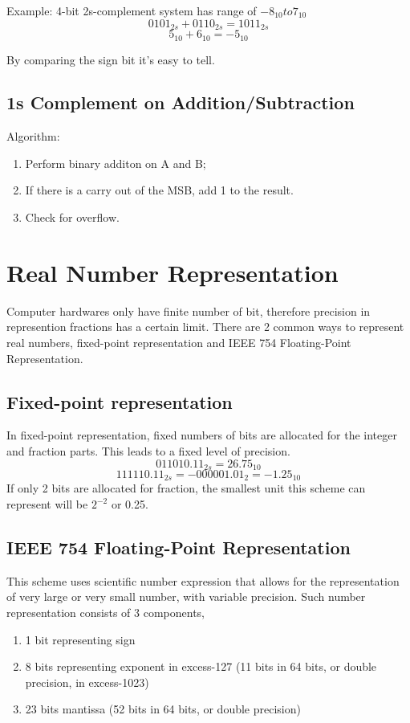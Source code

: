\documentclass[12pt]{article} %
\begin{document}
Example: 4-bit 2s-complement system has range of \(-8_{10} to 7_{10}\)
\[0101_{2s} + 0110_{2s} = 1011_{2s}\]
\[5_{10} + 6_{10} = -5_{10}\]

By comparing the sign bit it's easy to tell.

\subsection*{1s Complement on Addition/Subtraction}
Algorithm: 
\begin{enumerate}
    \item Perform binary additon on A and B;
    \item If there is a carry out of the MSB, add 1 to the result.
    \item Check for overflow.
\end{enumerate}    

\section{Real Number Representation}
Computer hardwares only have finite number of bit, therefore precision in represention fractions has a certain limit.
There are 2 common ways to represent real numbers, fixed-point representation and IEEE 754 Floating-Point Representation.

\subsection*{Fixed-point representation}
In fixed-point representation, fixed numbers of bits are allocated for the integer and fraction parts. This leads to a fixed level of precision.
\[011010.11_{2s} = 26.75_{10}\]
\[111110.11_{2s} = -000001.01_{2} = -1.25_{10}\]
If only 2 bits are allocated for fraction, the smallest unit this scheme can represent will be \(2^{-2}\) or 0.25.

\subsection*{IEEE 754 Floating-Point Representation}
This scheme uses scientific number expression that allows for the representation of very large or very small number, with variable precision.
Such number representation consists of 3 components,
\begin{enumerate}
    \item 1 bit representing sign
    \item 8 bits representing exponent in excess-127 (11 bits in 64 bits, or double precision, in excess-1023)
    \item 23 bits mantissa (52 bits in 64 bits, or double precision)
\end{enumerate}
\end{document}
